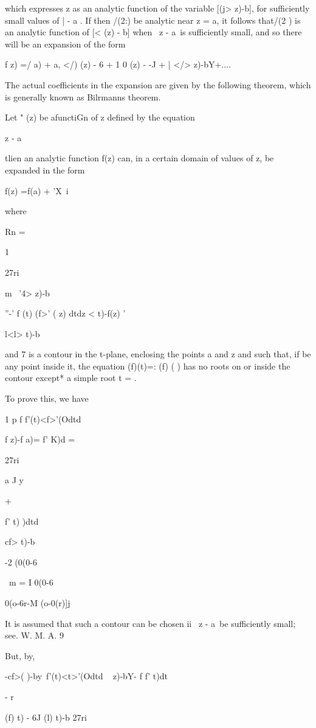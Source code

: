 which expresses z as an analytic function of the variable [(j> z)-b],
for sufficiently small values of | - a . If then /(2:) be analytic
near z = a, it follows that/(2 ) is an analytic function of [< (z) -
b] when \ z - a\ is sufficiently small, and so there will be an
expansion of the form

f z) =/ a) + a, </) (z) - 6 + 1 0 (z) - -J + | </> z)-bY+....

The actual coefficients in the expansion are given by the following
theorem, which is generally known as Bilrmanns theorem.

Let " (z) be afunctiGn of z defined by the equation 

z - a

tlien an analytic function f(z) can, in a certain domain of values of
z, be expanded in the form

f(z) =f(a) + 'X\ i %

where

Rn =

1

27ri

m \ '4> z)-b

''-' f (t) (f>' ( z) dtdz < t)-f(z) '

l<l> t)-b\

and 7 is a contour in the t-plane, enclosing the points a and z and
such that, if be any point inside it, the equation (f)(t)=: (f) ( )
has no roots on or inside the contour except* a simple root t = .

To prove this, we have

1 p f f'(t)<f>'(Odtd

f z)-f a)= f' K)d =

27ri

a J y

+

f' t) )dtd

cf> t)-b

-2 (0(0-6

\ m = I 0(0-6

 0(o-6r-M (o-0(r)]j

It is assumed that such a contour can be chosen ii \ z - a\ be
sufficiently small; see. W. M. A. 9

%
%

But, by,

-cf>( )-by\ f'(t)<t>'(Odtd \ < > z)-bY- f f' t)dt

- r

(f) t) - 6J (l) t)-b 27ri

